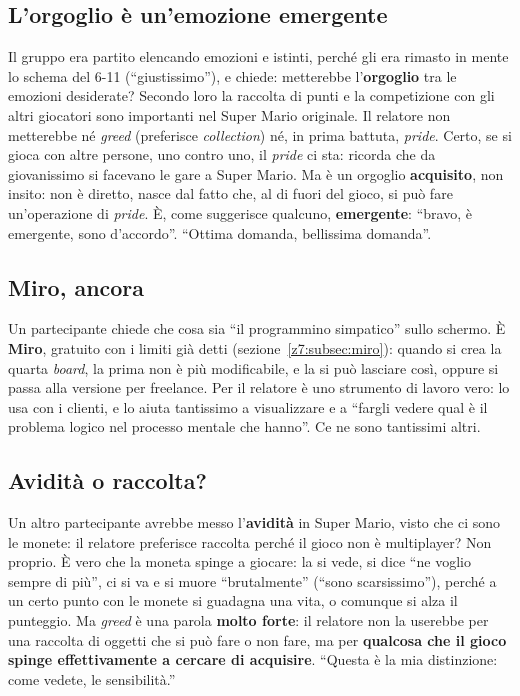 \subsection{L'orgoglio è un'emozione emergente}

Il gruppo era partito elencando emozioni e istinti, perché gli era rimasto in
mente lo schema del 6-11 (``giustissimo''), e chiede: metterebbe l'\textbf{orgoglio}
tra le emozioni desiderate? Secondo loro la raccolta di punti e la competizione
con gli altri giocatori sono importanti nel Super Mario originale. Il relatore
non metterebbe né \emph{greed} (preferisce \emph{collection}) né, in prima
battuta, \emph{pride}. Certo, se si gioca con altre persone, uno contro uno, il
\emph{pride} ci sta: ricorda che da giovanissimo si facevano le gare a Super
Mario. Ma è un orgoglio \textbf{acquisito}, non insito: non è diretto, nasce dal
fatto che, al di fuori del gioco, si può fare un'operazione di \emph{pride}. È,
come suggerisce qualcuno, \textbf{emergente}: ``bravo, è emergente, sono
d'accordo''. ``Ottima domanda, bellissima domanda''.

\subsection{Miro, ancora}

Un partecipante chiede che cosa sia ``il programmino simpatico'' sullo schermo.
È \textbf{Miro}, gratuito con i limiti già detti
(sezione~\ref{z7:subsec:miro}): quando si crea la quarta \emph{board}, la prima
non è più modificabile, e la si può lasciare così, oppure si passa alla versione
per freelance. Per il relatore è uno strumento di lavoro vero: lo usa con i
clienti, e lo aiuta tantissimo a visualizzare e a ``fargli vedere qual è il
problema logico nel processo mentale che hanno''. Ce ne sono tantissimi altri.

\subsection{Avidità o raccolta?}

Un altro partecipante avrebbe messo l'\textbf{avidità} in Super Mario, visto che
ci sono le monete: il relatore preferisce raccolta perché il gioco non è
multiplayer? Non proprio. È vero che la moneta spinge a giocare: la si vede, si
dice ``ne voglio sempre di più'', ci si va e si muore ``brutalmente'' (``sono
scarsissimo''), perché a un certo punto con le monete si guadagna una vita, o
comunque si alza il punteggio. Ma \emph{greed} è una parola \textbf{molto forte}:
il relatore non la userebbe per una raccolta di oggetti che si può fare o non
fare, ma per \textbf{qualcosa che il gioco spinge effettivamente a cercare di
acquisire}. ``Questa è la mia distinzione: come vedete, le sensibilità.''

